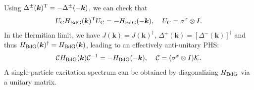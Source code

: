 \documentclass{tADP2e}
\theoremstyle{plain}
\theoremstyle{plain}
\theoremstyle{definition}
\begin{document}
\begin{appendices}
\begin{equation}
\end{equation}
Using $\Delta^\pm(\boldsymbol{k})^{\rm T}=-\Delta^\pm(-\boldsymbol{k})$, we can check that
\begin{equation}
U_{\rm C}H_{\rm BdG}(\boldsymbol{k})^{\rm T}U_{\rm C}=-H_{\rm BdG}(-\boldsymbol{k}),\;\;\;\;U_{\rm C}=\sigma^x\otimes I.
\end{equation}
In the Hermitian limit, we have $J(\boldsymbol{k})=J(\boldsymbol{k})^\dag$, $\Delta^+(\boldsymbol{k})=[\Delta^-(\boldsymbol{k})]^\dag$ and thus $H_{\rm BdG}(\boldsymbol{k})^\dag=H_{\rm BdG}(\boldsymbol{k})$, leading to an effectively anti-unitary PHS:
\begin{equation}
\mathcal{C}H_{\rm BdG}(\boldsymbol{k})\mathcal{C}^{-1}=-H_{\rm BdG}(-\boldsymbol{k}),\;\;\;\;
\mathcal{C}=(\sigma^x\otimes I)\mathcal{K}.
\end{equation}
A single-particle  excitation spectrum can be obtained by diagonalizing $H_{\rm BdG}$ via a unitary matrix.


\end{appendices}
\end{document}
